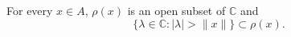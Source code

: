 For every $x \in A$, $\rho(x)$ is an open subset of $\mathbb{C}$ and
$$\{\lambda \in \mathbb{C} : |\lambda| > \|x\|\} \subset \rho(x).$$
